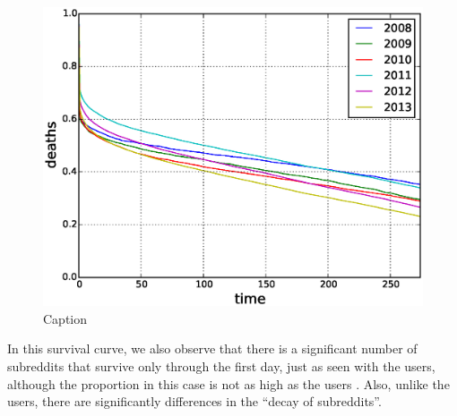 \begin{figure}[!tb]
\centering
\includegraphics[scale=0.4]{./images/kaplan_meier_subreddits.eps}
\caption{Caption}
\label{fig:kaplan_meier_subreddits}
\end{figure}

In this survival curve, we also observe that there is a significant number of subreddits that survive only through the first day, just as seen with the users, although the proportion in this case is not as high as the users . Also, unlike the users, there are significantly differences in the ``decay of subreddits''.
